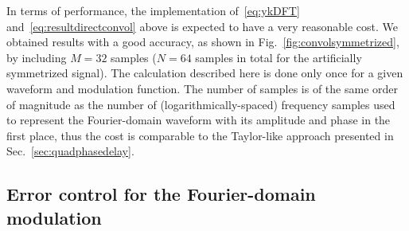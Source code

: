 \documentclass[aps,showpacs,%
prd,superscriptaddress,nofootinbib]{revtex4}
\begin{document}
In terms of performance, the implementation of~\eqref{eq:ykDFT} and~\eqref{eq:resultdirectconvol} above is expected to have a very reasonable cost. We obtained results with a good accuracy, as shown in Fig.~\ref{fig:convolsymmetrized}, by including $M=32$ samples ($N=64$ samples in total for the artificially symmetrized signal). The calculation described here is done only once for a given waveform and modulation function. The number of samples is of the same order of magnitude as the number of (logarithmically-spaced) frequency samples used to represent the Fourier-domain waveform with its amplitude and phase in the first place, thus the cost is comparable to the Taylor-like approach presented in Sec.~\ref{sec:quadphasedelay}. 


\subsection{Error control for the Fourier-domain modulation}
\label{subsec:errorsPrec}
\end{document}
